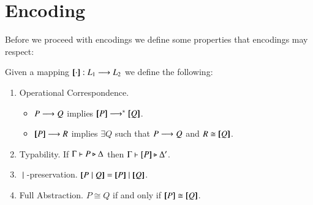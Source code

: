 \section{Encoding}

Before we proceed with encodings we define some properties
that encodings may respect:
\begin{definition}
	Given a mapping $[\!\![\cdot]\!\!]: L_1 \longrightarrow L_2$ we
	define the following:
	\begin{enumerate}
		\item	Operational Correspondence.
			\begin{itemize}
				\item	$P \longrightarrow Q$ implies $\map{P} \red^* \map{Q}$.
				\item	$[\!\![P]\!\!] \longrightarrow R$ implies $\exists Q$ such that $P \longrightarrow Q$ and $R \cong [\!\![Q]\!\!]$.	
			\end{itemize}
		\item	Typability. If $\Gamma \vdash P \triangleright \Delta$ then $\Gamma \vdash [\!\![P]\!\!] \triangleright \Delta'$.

		\item	$\;|\;$-preservation. $\map{P \Par Q} = \map{P} \Par \map{Q}$.

		\item	Full Abstraction. $P \cong Q$ if and only if $\map{P} \cong \map{Q}$.
	\end{enumerate}
\end{definition}

